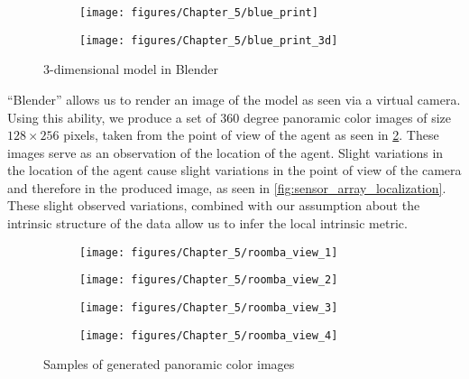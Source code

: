 	\begin{figure}[h]
		\begin{centering}
			\begin{subfigure}[b]{0.45\columnwidth}%
				\texttt{[image: figures/Chapter\_5/blue\_print]}
			\end{subfigure} \hfill
			\begin{subfigure}[b]{0.45\columnwidth}%
				\texttt{[image: figures/Chapter\_5/blue\_print\_3d]}
			\end{subfigure}
		\end{centering}
		\caption{3-dimensional model in Blender\label{fig:3D-model-in}}
	\end{figure}
	
	``Blender'' allows us to render an image of the model as seen via a virtual camera. Using this ability, we produce a set of 360 degree panoramic color images of size $128\times256$ pixels, taken from the point of view of the agent as seen in \cref{fig:Room-from-Agent's}. These images serve as an observation of the location of the agent. Slight variations in the location of the agent cause slight variations in the point of view of the camera and therefore in the produced image, as seen in \cref{fig:sensor_array_localization}. These slight observed variations, combined with our assumption about the intrinsic structure of the data allow us to infer the local intrinsic metric.
	
	\begin{figure}[h]
		\begin{centering}
			\begin{subfigure}[t]{0.47\columnwidth}
				\texttt{[image: figures/Chapter\_5/roomba\_view\_1]}
			\end{subfigure}\hfill
			\begin{subfigure}[t]{0.47\columnwidth}
				\texttt{[image: figures/Chapter\_5/roomba\_view\_2]}
			\end{subfigure}
		\end{centering}
	
		\begin{centering}
			\begin{subfigure}[t]{0.47\columnwidth}
				\texttt{[image: figures/Chapter\_5/roomba\_view\_3]}
			\end{subfigure}\hfill
			\begin{subfigure}[t]{0.47\columnwidth}
				\texttt{[image: figures/Chapter\_5/roomba\_view\_4]}
			\end{subfigure}
		\end{centering}
		\caption{Samples of generated panoramic color images}
		\label{fig:Room-from-Agent's}
	\end{figure}
	
